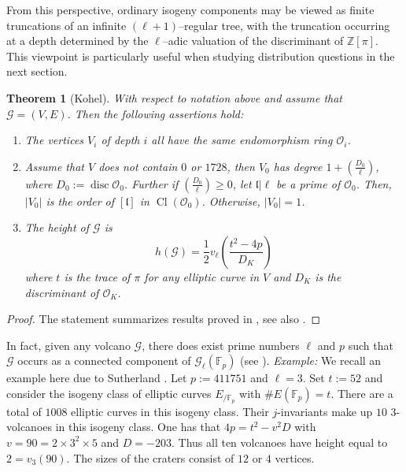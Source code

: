 \documentclass[table]{amsart}
\newtheorem{theorem}{Theorem}[section]
\newcommand{\Z}{\mathbb{Z}}
\newcommand{\F}{\mathbb{F}}
\newcommand{\cO}{\mathcal{O}}
\newcommand{\op}[1]{\operatorname{#1}}
\numberwithin{equation}{section}
\begin{document}
\par
From this perspective, ordinary isogeny components may be viewed as finite truncations of an infinite $(\ell+1)$–regular tree, with the truncation occurring at a depth determined by the $\ell$–adic valuation of the discriminant of $\Z[\pi]$. This viewpoint is particularly useful when studying distribution questions in the next section.
\begin{theorem}[Kohel]
    With respect to notation above and assume that $\mathcal{G}=(V,E)$. Then the following assertions hold:
    \begin{enumerate}
        \item The vertices $V_i$ of depth $i$ all have the same endomorphism ring $\cO_i$.
        \item Assume that $V$ does not contain $0$ or $1728$, then $V_0$ has degree $1+\left(\frac{D_0}{\ell}\right)$, where $D_0:=\op{disc}\cO_0$. Further if $\left(\frac{D_0}{\ell}\right)\geq 0$, let $\mathfrak{l}|\ell$ be a prime of $\cO_0$. Then, $|V_0|$ is the order of $[\mathfrak{l}]$ in $\op{Cl}(\cO_0)$. Otherwise, $|V_0|=1$.
        \item The height of $\mathcal{G}$ is \[h(\mathcal{G})=\frac{1}{2}v_\ell\left( \frac{t^2-4p}{D_K} \right)\] where $t$ is the trace of $\pi$ for any elliptic curve in $V$ and $D_K$ is the discriminant of $\cO_K$.
    \end{enumerate}
\end{theorem}
\begin{proof}
    The statement summarizes results proved in \cite{kohel}, see also \cite[Theorem 7]{sutherlandvolcanoes}.
\end{proof}
\noindent In fact, given any volcano $\mathcal{G}$, there does exist prime numbers $\ell$ and $p$ such that $\mathcal{G}$ occurs as a connected component of $\mathcal{G}_\ell(\F_p)$ (see \cite{inverse}).
\textit{Example:} We recall an example here due to Sutherland \cite[Example 9]{sutherlandvolcanoes}. Let $p:=411751$ and $\ell=3$. Set $t:=52$ and consider the isogeny class of elliptic curves $E_{/\F_p}$ with $\#E(\F_p)=t$. There are a total of $1008$ elliptic curves in this isogeny class. Their $j$-invariants make up $10$ $3$-volcanoes in this isogeny class. One has that $4p=t^2-v^2D$ with $v=90=2\times 3^2\times 5$ and $D=-203$. Thus all ten volcanoes have height equal to $2=v_3(90)$. The sizes of the craters consist of $12$ or $4$ vertices. 
\end{document}
